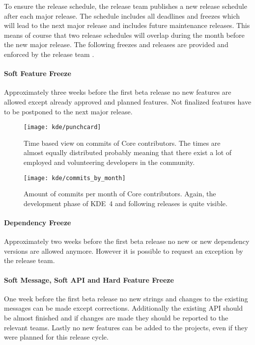 To ensure the release schedule, the release team publishes a new release
schedule after each major release. The schedule includes all deadlines and
freezes which will lead to the next major release and includes future
maintenance releases. This means of course that two release schedules will
overlap during the month before the new major release. The following freezes
and releases are provided and enforced by the release team
\cite{KDEReleaseSchedule}.

\paragraph{Soft Feature Freeze}

Approximately three weeks before the first beta release no new features are
allowed except already approved and planned features. Not finalized features
have to be postponed to the next major release.

\begin{figure}[hbtp]
  \centering
  \texttt{[image: kde/punchcard]}
  \caption{Time based view on commits of Core contributors. The times are
  almost equally distributed probably meaning that there exist a lot of
  employed and volunteering developers in the community.}
\end{figure}

\begin{figure}[htbp]
  \centering
  \texttt{[image: kde/commits\_by\_month]}
  \caption{Amount of commits per month of Core contributors. Again, the
  development phase of KDE~4 and following releases is quite visible.}
\end{figure}

\paragraph{Dependency Freeze}

Approximately two weeks before the first beta release no new or new dependency
versions are allowed anymore. However it is possible to request an exception by
the release team.

\paragraph{Soft Message, Soft API and Hard Feature Freeze}

One week before the first beta release no new strings and changes to the
existing messages can be made except corrections. Additionally the existing
\ac{API} should be almost finished and if changes are made they should be
reported to the relevant teams. Lastly no new features can be added to the
projects, even if they were planned for this release cycle.

